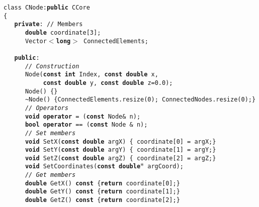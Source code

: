 {\sffamily \raggedright
\footnotesize \texttt{class\ CNode:\textbf{public}\ CCore\\
\{\\
\ \ \ \textbf{private}: // Members\\
\ \ \ \ \ \ \textbf{double}\ coordinate[3];\\
\ \ \ \ \ \ Vector$<${}\textbf{long}$>${} ConnectedElements;\ \ \ \\
\ \ \ \ \ \ \ \ \ \\
\ \ \ \textbf{public}:\\
\ \ \ \ \ \ \textsl{//\ Construction}\\
\ \ \ \ \ \ Node(\textbf{const}\ \textbf{int}\ Index,\ \textbf{const}\ \textbf{double}\ x,\ \\
\ \ \ \ \ \ \ \ \ \ \ \textbf{const}\ \textbf{double}\ y,\ \textbf{const}\ \textbf{double}\ z=0.0);\\
\ \ \ \ \ \ Node()\ \{\}\\
\ \ \ \ \ \ \textasciitilde Node()\ \{ConnectedElements.resize(0); ConnectedNodes.resize(0);\}\\
\ \ \ \ \ \ \textsl{//\ Operators}\\
\ \ \ \ \ \ \textbf{void}\ \textbf{operator}\ =\ (\textbf{const}\ Node\&\ n);\\
\ \ \ \ \ \ \textbf{bool}\ \textbf{operator}\ ==\ (\textbf{const}\ Node\ \&\ n);\\
\ \ \ \ \ \ \textsl{//\ Set members}\\
\ \ \ \ \ \ \textbf{void}\ SetX(\textbf{const}\ \textbf{double}\ argX)\ \{\ coordinate[0]\ =\ argX;\}\\
\ \ \ \ \ \ \textbf{void}\ SetY(\textbf{const}\ \textbf{double}\ argY)\ \{\ coordinate[1]\ =\ argY;\}\\
\ \ \ \ \ \ \textbf{void}\ SetZ(\textbf{const}\ \textbf{double}\ argZ)\ \{\ coordinate[2]\ =\ argZ;\}\\
\ \ \ \ \ \ \textbf{void}\ SetCoordinates(\textbf{const}\ \textbf{double}$\ast$\ argCoord);\ \\
\ \ \ \ \ \ \textsl{//\ Get members}\\
\ \ \ \ \ \ \textbf{double}\ GetX()\ \textbf{const}\ \{\textbf{return}\ coordinate[0];\}\\
\ \ \ \ \ \ \textbf{double}\ GetY()\ \textbf{const}\ \{\textbf{return}\ coordinate[1];\}\\
\ \ \ \ \ \ \textbf{double}\ GetZ()\ \textbf{const}\ \{\textbf{return}\ coordinate[2];\}\\
}}
